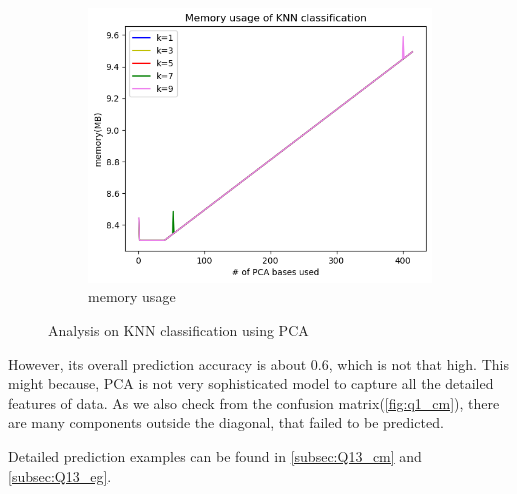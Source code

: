 \begin{figure}[htbp]
\begin{subfigure}[t]{0.3\linewidth}
		\centering
		\includegraphics[width=\linewidth]{image/q1_memory.png}
		\caption{memory usage}
		\label{fig:q1_knn_memory}
	\end{subfigure}

	\caption{Analysis on KNN classification using PCA}
	\label{fig:pca_knn}
\end{figure}

However, its overall prediction accuracy is about 0.6, which is not that high. This might because, PCA is not very sophisticated model to capture all the detailed features of data. As we also check from the confusion matrix(\cref{fig:q1_cm}), there are many components outside the diagonal, that failed to be predicted.


Detailed prediction examples can be found in \cref{subsec:Q13_cm} and \cref{subsec:Q13_eg}.